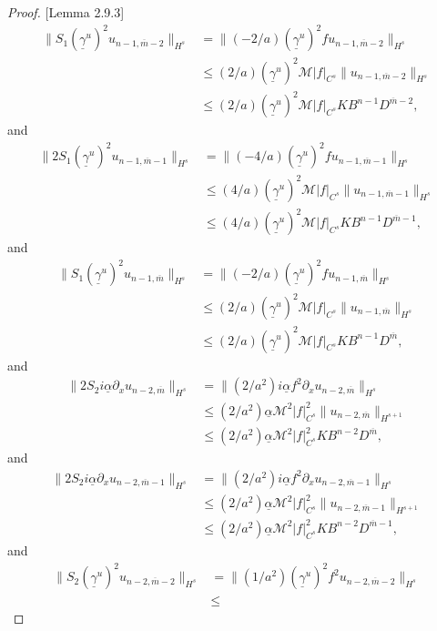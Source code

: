 \begin{proof}{[Lemma 2.9.3]}
\begin{align*}
\|S_1(\underline{\gamma}^u)^2u_{n-1,\overline{m}-2}\|_{H^{s}}&=\|(-2/a)(\underline{\gamma}^u)^2fu_{n-1,\overline{m}-2}\|_{H^{s}}\\&\le
(2/a)(\underline{\gamma}^u)^2\mathcal{M}|f|_{C^{s}}\|u_{n-1, \overline{m}-2}\|_{H^{s}}\\&\le
(2/a)(\underline{\gamma}^u)^2\mathcal{M}|f|_{C^{s}}KB^{n-1}D^{\overline{m}-2},
\end{align*}
and
\begin{align*}
\|2S_1(\underline{\gamma}^u)^2u_{n-1,\overline{m}-1}\|_{H^{s}}&=\|(-4/a)(\underline{\gamma}^u)^2fu_{n-1,\overline{m}-1}\|_{H^{s}}\\&\le
(4/a)(\underline{\gamma}^u)^2\mathcal{M}|f|_{C^{s}}\|u_{n-1, \overline{m}-1}\|_{H^{s}}\\&\le
(4/a)(\underline{\gamma}^u)^2\mathcal{M}|f|_{C^{s}}KB^{n-1}D^{\overline{m}-1},
\end{align*}
and
\begin{align*}
\|S_1(\underline{\gamma}^u)^2u_{n-1,\overline{m}}\|_{H^{s}}&=\|(-2/a)(\underline{\gamma}^u)^2fu_{n-1,\overline{m}}\|_{H^{s}}\\&\le
(2/a)(\underline{\gamma}^u)^2\mathcal{M}|f|_{C^{s}}\|u_{n-1, \overline{m}}\|_{H^{s}}\\&\le
(2/a)(\underline{\gamma}^u)^2\mathcal{M}|f|_{C^{s}}KB^{n-1}D^{\overline{m}},
\end{align*}
and
\begin{align*}
\|2S_2i\underline{\alpha}\partial_xu_{n-2,\overline{m}}\|_{H^{s}}&=\|(2/a^2)i\underline{\alpha}f^2\partial_xu_{n-2,\overline{m}}\|_{H^{s}}\\&\le
(2/a^2)\underline{\alpha}\mathcal{M}^2|f|_{C^{s}}^2\|u_{n-2, \overline{m}}\|_{H^{s+1}}\\&\le
(2/a^2)\underline{\alpha}\mathcal{M}^2|f|_{C^{s}}^2KB^{n-2}D^{\overline{m}},
\end{align*}
and
\begin{align*}
\|2S_2i\underline{\alpha}\partial_xu_{n-2,\overline{m}-1}\|_{H^{s}}&=\|(2/a^2)i\underline{\alpha}f^2\partial_xu_{n-2,\overline{m}-1}\|_{H^{s}}\\&\le
(2/a^2)\underline{\alpha}\mathcal{M}^2|f|_{C^{s}}^2\|u_{n-2, \overline{m}-1}\|_{H^{s+1}}\\&\le
(2/a^2)\underline{\alpha}\mathcal{M}^2|f|_{C^{s}}^2KB^{n-2}D^{\overline{m}-1},
\end{align*}
and
\begin{align*}
\|S_2(\underline{\gamma}^u)^2u_{n-2,\overline{m}-2}\|_{H^{s}}&=\|(1/a^2)(\underline{\gamma}^u)^2f^2u_{n-2,\overline{m}-2}\|_{H^{s}}\\&\le

\end{align*}
\end{proof}
